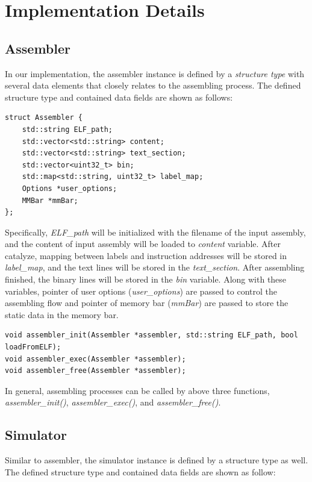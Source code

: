\documentclass[conference, draftclsnofoot, letterpaper]{IEEETran}
\begin{document}
\section{Implementation Details}

\subsection{Assembler}

In our implementation, the assembler instance is defined by a \textit{structure type} with several data elements that closely relates to the assembling process. The defined structure type and contained data fields are shown as follows: 
\begin{lstlisting}
struct Assembler {
	std::string ELF_path;
	std::vector<std::string> content;
	std::vector<std::string> text_section;
	std::vector<uint32_t> bin;
	std::map<std::string, uint32_t> label_map;
	Options *user_options;
	MMBar *mmBar;
};
\end{lstlisting}

Specifically, \emph{ELF\_path} will be initialized with the filename of the input assembly, and the content of input assembly will be loaded to \emph{content} variable. After catalyze, mapping between labels and instruction addresses will be stored in \emph{label\_map}, and the text lines will be stored in the \emph{text\_section}. After assembling finished, the binary lines will be stored in the \emph{bin} variable. Along with these variables, pointer of user options (\emph{user\_options}) are passed to control the assembling flow and pointer of memory bar (\emph{mmBar}) are passed to store the static data in the memory bar.  

\begin{lstlisting}
void assembler_init(Assembler *assembler, std::string ELF_path, bool loadFromELF);
void assembler_exec(Assembler *assembler);
void assembler_free(Assembler *assembler);
\end{lstlisting}

In general, assembling processes can be called by above three functions, \emph{assembler\_init()}, \emph{assembler\_exec()}, and \emph{assembler\_free()}.

\subsection{Simulator}

Similar to assembler, the simulator instance is defined by a structure type as well. The defined structure type and contained data fields are shown as follow:
\end{document}
